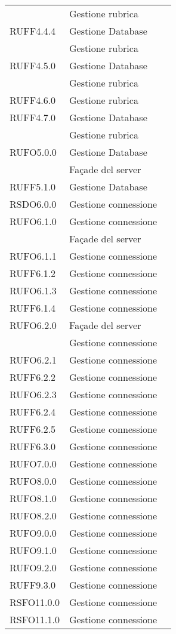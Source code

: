 \begin{center}
\begin{longtable}{lp{}l}
 & Gestione rubrica \\
RUFF4.4.4 & Gestione Database \\
 & Gestione rubrica \\
RUFF4.5.0 & Gestione Database \\
 & Gestione rubrica \\
RUFF4.6.0 & Gestione rubrica \\
RUFF4.7.0 & Gestione Database \\
 & Gestione rubrica \\
RUFO5.0.0 & Gestione Database \\
 & Façade del server \\
RUFF5.1.0 & Gestione Database \\
RSDO6.0.0 & Gestione connessione \\
RUFO6.1.0 & Gestione connessione \\
 & Façade del server \\
RUFO6.1.1 & Gestione connessione \\
RUFF6.1.2 & Gestione connessione \\
RUFO6.1.3 & Gestione connessione \\
RUFF6.1.4 & Gestione connessione \\
RUFO6.2.0 & Façade del server \\
 & Gestione connessione \\
RUFO6.2.1 & Gestione connessione \\
RUFF6.2.2 & Gestione connessione \\
RUFO6.2.3 & Gestione connessione \\
RUFF6.2.4 & Gestione connessione \\
RUFF6.2.5 & Gestione connessione \\
RUFF6.3.0 & Gestione connessione \\
RUFO7.0.0 & Gestione connessione \\
RUFO8.0.0 & Gestione connessione \\
RUFO8.1.0 & Gestione connessione \\
RUFO8.2.0 & Gestione connessione \\
RUFO9.0.0 & Gestione connessione \\
RUFO9.1.0 & Gestione connessione \\
RUFO9.2.0 & Gestione connessione \\
RUFF9.3.0 & Gestione connessione \\
RSFO11.0.0 & Gestione connessione \\
RSFO11.1.0 & Gestione connessione \\

\end{longtable}
\end{center}
